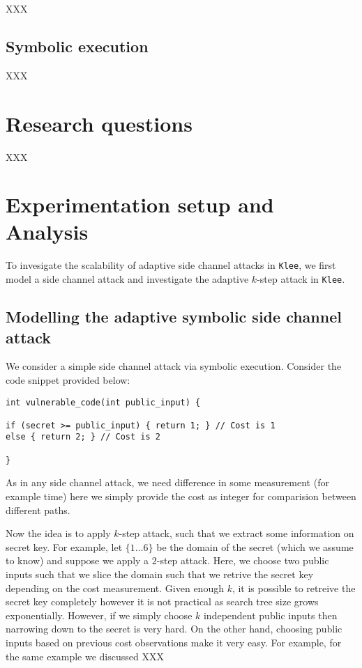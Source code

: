 \documentclass[11pt,a4paper,notitlepage]{article}
\begin{document}
XXX 

\subsection{Symbolic execution}
\label{sec:symbolicexecution}

XXX

\newpage

\section{Research questions}
\label{sec:researchquestions}

XXX

\newpage

\section{Experimentation setup and Analysis}
\label{sec:experimentationanddesign}

To invesigate the scalability of adaptive side channel attacks in \texttt{Klee}, we first model a side channel attack and investigate the adaptive $k$-step attack in \texttt{Klee}.

\subsection{Modelling the adaptive symbolic side channel attack}
\label{subsec:modellingsscattack}

We consider a simple side channel attack via symbolic execution.
Consider the code snippet provided below:
\begin{verbatim}
int vulnerable_code(int public_input) {

if (secret >= public_input) { return 1; } // Cost is 1
else { return 2; } // Cost is 2

}
\end{verbatim}

As in any side channel attack, we need difference in some measurement (for example time) here we simply provide the cost as integer
for comparision between different paths.

Now the idea is to apply $k$-step attack, such that we extract some information on secret key.
For example, let $\{1 \dots 6\}$ be the domain of the secret (which we assume to know) and suppose we apply a $2$-step attack.
Here, we choose two public inputs such that we slice the domain such that we retrive the secret key depending on the cost measurement.
Given enough $k$, it is possible to retreive the secret key completely however it is not practical as search tree size grows exponentially.
However, if we simply choose $k$ independent public inputs then narrowing down to the secret is very hard.
On the other hand, choosing public inputs based on previous cost observations make it very easy.
For example, for the same example we discussed XXX
\end{document}

